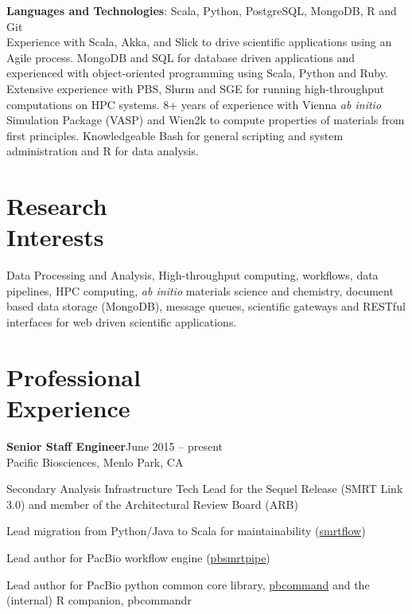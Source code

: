 \documentclass[margin,line]{resume}
\begin{document}
\begin{resume}
    \textbf{Languages and Technologies}: Scala, Python, PostgreSQL, MongoDB, R and Git\vspace{2mm}\\
                Experience with Scala, Akka, and Slick to drive scientific applications using an Agile process. MongoDB and SQL for database driven applications and experienced with object-oriented programming using
                Scala, Python and Ruby. Extensive experience with PBS, Slurm and SGE for running high-throughput computations on HPC systems. 8+ years of experience with Vienna
                \textsl{ab initio} Simulation Package (VASP) and Wien2k to compute properties of materials from first principles. Knowledgeable Bash for general scripting and system administration and R for data analysis.




    \section{\mysidestyle Research\\Interests}

    Data Processing and Analysis, High-throughput computing, workflows, data pipelines, HPC computing, \textsl{ab initio} materials science
    and chemistry, document based data storage (MongoDB), message queues, scientific gateways and RESTful interfaces for web driven scientific applications.

    
  \section{\mysidestyle Professional\\Experience}
  \textbf{Senior Staff Engineer}\hfill June 2015 -- present\vspace{1mm}\\
     Pacific Biosciences, Menlo Park, CA\\\vspace{-3.0mm}
       \begin{list2}
       \item Secondary Analysis Infrastructure Tech Lead for the Sequel Release (SMRT Link 3.0) and member of the Architectural Review Board (ARB)
       \item Lead migration from Python/Java to Scala for maintainability (\href{https://github.com/PacificBiosciences/smrtflow}{smrtflow})
       \item Lead author for PacBio workflow engine (\href{https://github.com/PacificBiosciences/pbsmrtpipe}{pbsmrtpipe})
       \item Lead author for PacBio python common core library, \href{https://github.com/PacificBiosciences/pbcommand}{pbcommand} and the (internal) R companion, pbcommandr
   \end{list2}


\end{resume}
\end{document}
